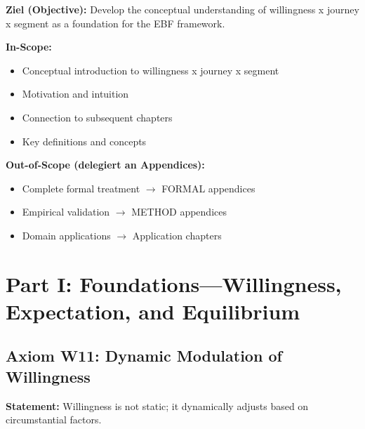 \documentclass[11pt, a4paper]{article}
\begin{document}
\begin{tcolorbox}[
    colback=purple!5!white,
    colframe=purple!75!black,
    title={\textbf{Chapter Scope: Ziel / In-Scope / Out-of-Scope}},
    fonttitle=\bfseries
]

\textbf{Ziel (Objective):}
Develop the conceptual understanding of willingness x journey x segment as a foundation for the EBF framework.

\vspace{0.3cm}
\textbf{In-Scope:}
\begin{itemize}[nosep]
    \item Conceptual introduction to willingness x journey x segment
    \item Motivation and intuition
    \item Connection to subsequent chapters
    \item Key definitions and concepts
\end{itemize}

\vspace{0.3cm}
\textbf{Out-of-Scope (delegiert an Appendices):}
\begin{itemize}[nosep]
    \item Complete formal treatment $\rightarrow$ FORMAL appendices
    \item Empirical validation $\rightarrow$ METHOD appendices
    \item Domain applications $\rightarrow$ Application chapters
\end{itemize}

\end{tcolorbox}



\section{Part I: Foundations---Willingness, Expectation, and Equilibrium}\label{sec:ch15-part1a}

\subsection{Axiom W11: Dynamic Modulation of Willingness} \label{sec:ch15-part1a}

\textbf{Statement:} Willingness is not static; it dynamically adjusts based on circumstantial factors.
\end{document}
